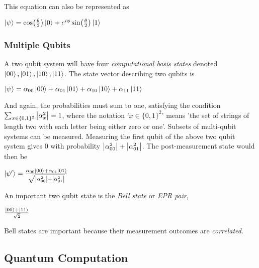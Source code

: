 \documentclass{article}
\begin{document}
This equation can also be represented as 

\begin{center}
  $\ket{\psi} = \cos(\frac{\theta}{2})\ket{0} + e^{i\phi}\sin(\frac{\theta}{2})\ket{1}$
\end{center}

\subsubsection{Multiple Qubits}
A two qubit system will have four \emph{computational basis states} denoted
$\ket{00}, \ket{01}, \ket{10}, \ket{11}$. The state vector describing two qubits is

\begin{center}
  $\ket{\psi} = \alpha_{00}\ket{00} + \alpha_{01}\ket{01} + \alpha_{10}\ket{10} + \alpha_{11}\ket{11}$
\end{center}
And again, the probabilities must sum to one, satisfying the condition
$\sum_{x \in \{0, 1\}^{2}}{\abs{\alpha_{x}^{2}} = 1}$, where the notation
'$x \in \{0, 1\}^{2}$' means 'the set of strings of length two with each letter
being either zero or one'.  Subsets of multi-qubit systems can be measured.
Measuring the first qubit of the above two qubit system gives $0$ with
probability $\abs{\alpha_{00}^{2}} + \abs{\alpha_{01}^{2}}$. The
post-measurement state would then be

\begin{center}
    $\ket{\psi'} = \frac{\alpha_{00}\ket{00} + \alpha_{01}\ket{01} }{\sqrt{\abs{\alpha_{00}^{2}} + \abs{\alpha_{01}^{2}}}}$
\end{center}

An important two qubit state is the \emph{Bell state} or \emph{EPR pair}, 

\begin{center}
    $\frac{\ket{00} + \ket{11}}{\sqrt{2}}$
\end{center}

Bell states are important because their measurement outcomes are
\emph{correlated}.

\subsection{Quantum Computation}

\end{document}
